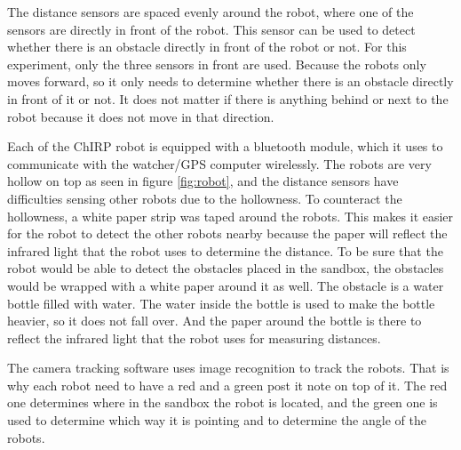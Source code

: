 The distance sensors are spaced evenly around the robot, where one of the sensors are directly in front of the robot. This sensor can be used to detect whether there is an obstacle directly in front of the robot or not. For this experiment, only the three sensors in front are used. Because the robots only moves forward, so it only needs to determine whether there is an obstacle directly in front of it or not. It does not matter if there is anything behind or next to the robot because it does not move in that direction.

Each of the ChIRP robot is equipped with a bluetooth module, which it uses to communicate with the watcher/GPS computer wirelessly. 
The robots are very hollow on top as seen in figure \ref{fig:robot}, and the distance sensors have difficulties sensing other robots due to the hollowness. To counteract the hollowness, a white paper strip was taped around the robots. This makes it easier for the robot to detect the other robots nearby because the paper will reflect the infrared light that the robot uses to determine the distance. To be sure that the robot would be able to detect the obstacles placed in the sandbox, the obstacles would be wrapped with a white paper around it as well.
The obstacle is a water bottle filled with water. The water inside the bottle is used to make the bottle heavier, so it does not fall over. And the paper around the bottle is there to reflect the infrared light that the robot uses for measuring distances.

The camera tracking software uses image recognition to track the robots. That is why each robot need to have a red and a green post it note on top of it. The red one determines where in the sandbox the robot is located, and the green one is used to determine which way it is pointing and to determine the angle of the robots.


